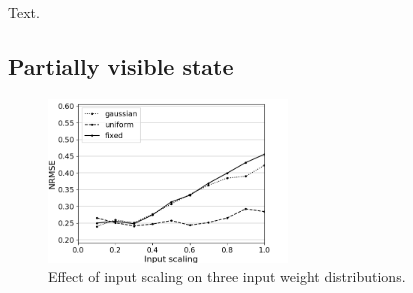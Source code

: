 Text.


\subsection{Partially visible state}

\begin{figure}[H]
  \centering
  \includegraphics[width=2.5in]{img/input_scaling_distrib.png}
  \caption{
    Effect of input scaling on three input weight distributions.
  }
  \label{input_scaling_distrib}
\end{figure}

